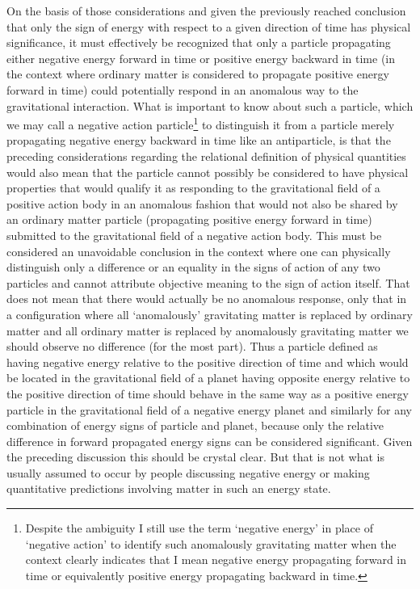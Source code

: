 \documentclass[notitlepage,12pt]{report}
\begin{document}
On the basis of those considerations and given the previously reached conclusion that only the sign of energy with respect to a given direction of time has physical significance, it must effectively be recognized that only a particle propagating either negative energy forward in time or positive energy backward in time (in the context where ordinary matter is considered to propagate positive energy forward in time) could potentially respond in an anomalous way to the gravitational interaction. What is important to know about such a particle, which we may call a negative action particle\footnote{Despite the ambiguity I still use the term `negative energy' in place of `negative action' to identify such anomalously gravitating matter when the context clearly indicates that I mean negative energy propagating forward in time or equivalently positive energy propagating backward in time.} to distinguish it from a particle merely propagating negative energy backward in time like an antiparticle, is that the preceding considerations regarding the relational definition of physical quantities would also mean that the particle cannot possibly be considered to have physical properties that would qualify it as responding to the gravitational field of a positive action body in an anomalous fashion that would not also be shared by an ordinary matter particle (propagating positive energy forward in time) submitted to the gravitational field of a negative action body. This must be considered an unavoidable conclusion in the context where one can physically distinguish only a difference or an equality in the signs of action of any two particles and cannot attribute objective meaning to the sign of action itself. That does not mean that there would actually be no anomalous response, only that in a configuration where all `anomalously' gravitating matter is replaced by ordinary matter and all ordinary matter is replaced by anomalously gravitating matter we should observe no difference (for the most part). Thus a particle defined as having negative energy relative to the positive direction of time and which would be located in the gravitational field of a planet having opposite energy relative to the positive direction of time should behave in the same way as a positive energy particle in the gravitational field of a negative energy planet and similarly for any combination of energy signs of particle and planet, because only the relative difference in forward propagated energy signs can be considered significant. Given the preceding discussion this should be crystal clear. But that is not what is usually assumed to occur by people discussing negative energy or making quantitative predictions involving matter in such an energy state.
\end{document}
